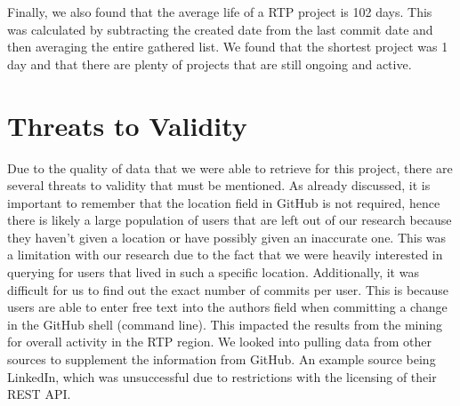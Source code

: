 Finally, we also found that the average life of a RTP project is 102 days. This was calculated by subtracting the created date from the last commit date and then averaging the entire gathered list. We found that the shortest project was 1 day and that there are plenty of projects that are still ongoing and active.

\section{Threats to Validity}
Due to the quality of data that we were able to retrieve for this project, there are several threats to validity that must be mentioned. As already discussed, it is important to remember that the location field in GitHub is not required, hence there is likely a large population of users that are left out of our research because they haven't given a location or have possibly given an inaccurate one. This was a limitation with our research due to the fact that we were heavily interested in querying for users that lived in such a specific location. Additionally, it was difficult for us to find out the exact number of commits per user. This is because users are able to enter free text into the authors field when committing a change in the GitHub shell (command line). This impacted the results from the mining for overall activity in the RTP region. We looked into pulling data from other sources to supplement the information from GitHub. An example source being LinkedIn, which was unsuccessful due to restrictions with the licensing of their REST API.
